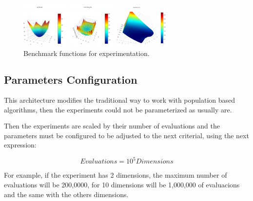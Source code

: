 \documentclass[runningheads]{llncs}
\begin{document}
\begin{figure}[htp]
  \centering
    \includegraphics[width=0.7\textwidth]{img/benchmark.png}
    \caption{Benchmark functions for experimentation.} \label{fig6}
    \end{figure}

\subsection{Parameters Configuration} 

This architecture modifies the traditional way to work with population based
algorithms, then the experiments could not be parameterized as usually are.

Then the experiments are scaled by their number of evaluations and the
parameters must be configured to be adjusted to the next criterial, using the
next expression:

\begin{equation}
    \label{eq:hesitancy-interpretation}
   Evaluations = 10^{5} Dimensions
   \end{equation}

For example, if the experiment has 2 dimensions, the maximum number of
evaluations will be 200,0000, for 10 dimensions will be 1,000,000 of evaluacions
and the same with the others dimensions.
\end{document}
